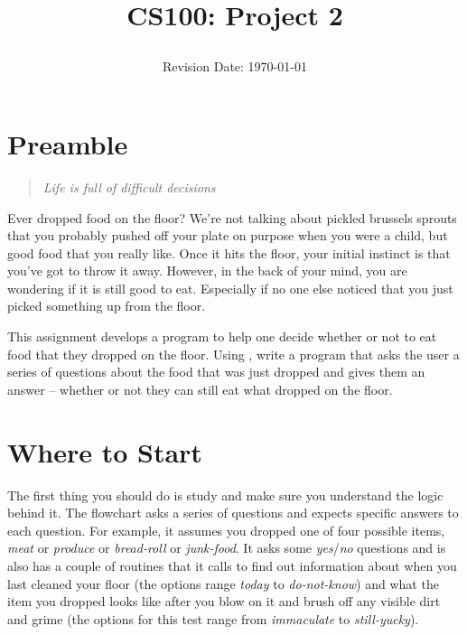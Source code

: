 \documentclass[12pt]{article}
\title{CS100: Project 2\\
\date{Revision Date: \today}}
\begin{document}
\maketitle

\thispagestyle{empty}

\W\subsubsection*{}
\W\htmlrule


\section*{Preamble}

\begin{quote}
{\it Life is full of difficult decisions}
\end{quote}

Ever dropped food on the floor?  We're not talking about pickled brussels sprouts 
that you probably pushed off your plate on purpose when you were a child, but
good food that you really like.  Once it hits the floor, your initial instinct is
that you've got to throw it away.  However, in the back of your mind, you are
wondering if it is still good to eat.  Especially if no one else noticed that
you just picked something up from the floor.

This assignment develops a program to help one decide whether or not to eat
food that they dropped on the floor.
Using ,
write a program that asks the user a series of questions about the food that
was just dropped and gives them an answer -- whether or not they can still eat
what dropped on the floor.

\section*{Where to Start}

The first thing you should do is study 
 and make sure you understand
the logic behind it.  The flowchart asks a series of questions and expects specific
answers to each question.  For example, it assumes you dropped one of four
possible items, {\it meat} or {\it produce} or {\it bread-roll} or {\it junk-food}.
It asks some {\it yes}/{\it no} questions and is also has a couple of routines
that it calls to find out information about when you last cleaned your floor (the options 
range {\it today} to {\it do-not-know}) and what the item you dropped looks like
after you blow on it and brush off any visible dirt and grime (the options for
this test range from {\it immaculate} to {\it still-yucky}).
\end{document}
